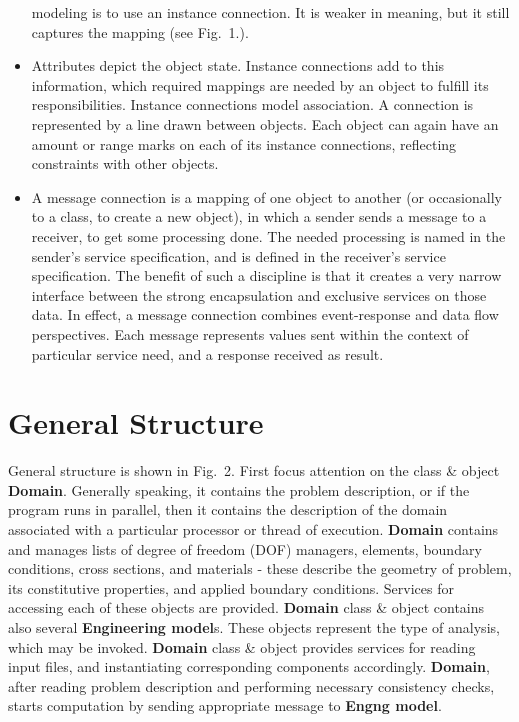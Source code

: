 \documentclass[a4paper]{article}
\newcommand{\class}[1]{{\bf #1}}
\begin{document}
\begin{itemize}
modeling is to use an instance connection. It is weaker in meaning, but
it still captures the mapping (see Fig.~1.). 
\item
Attributes depict the object state. Instance connections add to this
information, which required mappings are needed by an object to fulfill
its responsibilities. Instance connections model association. A
connection is represented by a line drawn between objects. Each object
can again have an amount or range marks on each of its instance
connections, reflecting constraints with other objects.
\item
A message connection is a mapping of one object to another (or
occasionally to a class, to create a new object), in which a sender
sends a message to a receiver, to get some processing done. The needed
processing is named in the sender's service specification, and is defined
in the receiver's service specification. The benefit of such a discipline
is that it creates a very narrow interface between the strong
encapsulation and exclusive services on those data. In effect, a
message connection combines event-response and data flow perspectives.
Each message represents values sent within the context of
particular service need, and a response received as result.
\end{itemize}


\section{General Structure}

General structure is shown in Fig.~2.
First focus attention on the class \& object \class{Domain}. Generally
speaking, it contains the problem description, or if the program runs in
parallel, then it contains the description of the domain associated
with a particular processor or thread of execution. \class{Domain} 
contains and manages lists of degree of freedom (DOF) managers, elements, boundary
conditions, cross sections, and materials - these describe the geometry
of problem, its constitutive properties, and applied boundary
conditions. Services for accessing each of these objects are
provided. \class{Domain} class \& object contains also several \class{Engineering
model}s. These objects represent the type of analysis, which may be
invoked. 
\class{Domain} class \& object provides services for reading input
files, and instantiating corresponding components accordingly. \class{Domain},
after reading problem description and performing necessary consistency
checks, starts computation by sending appropriate message to
\class{Engng model}.
\end{document}
